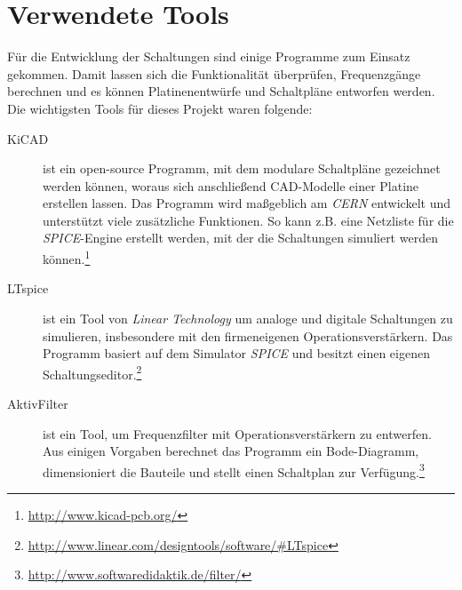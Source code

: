 \section{Verwendete Tools}
Für die Entwicklung der Schaltungen sind einige Programme zum Einsatz gekommen. Damit lassen sich die Funktionalität überprüfen, Frequenzgänge berechnen und es können Platinenentwürfe und Schaltpläne entworfen werden. Die wichtigsten Tools für dieses Projekt waren folgende:
\begin{description}
	\item[KiCAD] ist ein open-source Programm, mit dem modulare Schaltpläne gezeichnet werden können, woraus sich anschließend CAD-Modelle einer Platine erstellen lassen. Das Programm wird maßgeblich am \textit{CERN} entwickelt und unterstützt viele zusätzliche Funktionen. So kann z.B. eine Netzliste für die \textit{SPICE}-Engine erstellt werden, mit der die Schaltungen simuliert werden können.\footnote{\url{http://www.kicad-pcb.org/}}
	\item[LTspice] ist ein Tool von \textit{Linear Technology} um analoge und digitale Schaltungen zu simulieren, insbesondere mit den firmeneigenen Operationsverstärkern. Das Programm basiert auf dem Simulator \textit{SPICE} und besitzt einen eigenen Schaltungseditor.\footnote{\url{http://www.linear.com/designtools/software/\#LTspice}}
	\item[AktivFilter] ist ein Tool, um Frequenzfilter mit Operationsverstärkern zu entwerfen. Aus einigen Vorgaben berechnet das Programm ein Bode-Diagramm, dimensioniert die Bauteile und stellt einen Schaltplan zur Verfügung.\footnote{\url{http://www.softwaredidaktik.de/filter/}}
\end{description}


